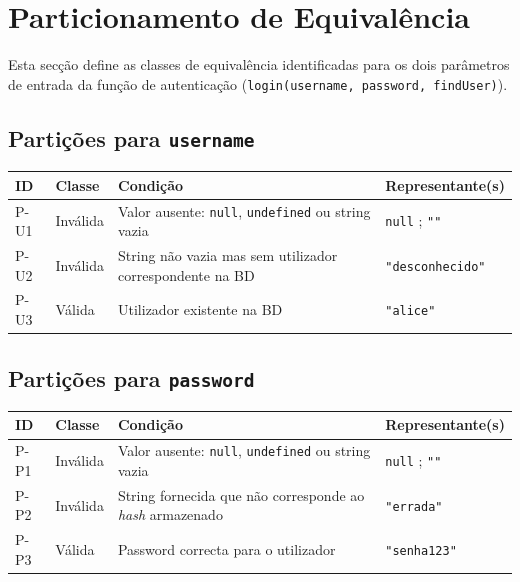 \documentclass[a4paper,11pt]{article}
\begin{document}
\section{Particionamento de Equivalência}

Esta secção define as classes de equivalência identificadas para os dois
parâmetros de entrada da função de autenticação
(\texttt{login(username, password, findUser)}).

\subsection{Partições para \texttt{username}}

\begin{tabular}{@{}C{1.4cm}C{2.2cm}L{5cm}L{4.5cm}@{}}
  \toprule
  \textbf{ID} & \textbf{Classe} & \textbf{Condição} & \textbf{Representante(s)} \\
  \midrule
  P-U1 & Inválida & Valor ausente: \texttt{null}, \texttt{undefined} ou string vazia
       & \texttt{null} ; \texttt{""} \\
  P-U2 & Inválida & String não vazia mas sem utilizador correspondente na BD
       & \texttt{"desconhecido"} \\
  P-U3 & Válida   & Utilizador existente na BD
       & \texttt{"alice"} \\
  \bottomrule
\end{tabular}

\subsection{Partições para \texttt{password}}

\begin{tabular}{@{}C{1.4cm}C{2.2cm}L{5cm}L{4.5cm}@{}}
  \toprule
  \textbf{ID} & \textbf{Classe} & \textbf{Condição} & \textbf{Representante(s)} \\
  \midrule
  P-P1 & Inválida & Valor ausente: \texttt{null}, \texttt{undefined} ou string vazia
       & \texttt{null} ; \texttt{""} \\
  P-P2 & Inválida & String fornecida que não corresponde ao \textit{hash} armazenado
       & \texttt{"errada"} \\
  P-P3 & Válida   & Password correcta para o utilizador
       & \texttt{"senha123"} \\
  \bottomrule
\end{tabular}
\end{document}
